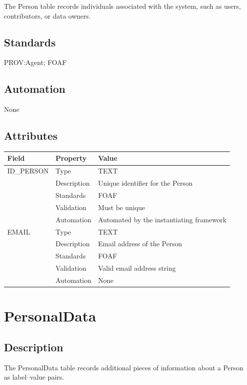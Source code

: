 The Person table records individuals associated with the system, such as
users, contributors, or data owners.

\subsection{Standards}\label{standards-22}

PROV:Agent; FOAF

\subsection{Automation}\label{automation-22}

None

\subsection{Attributes}\label{attributes-19}

\begin{longtable}[]{@{}lll@{}}
\toprule\noalign{}
Field & Property & Value \\
\midrule\noalign{}
\endhead
\bottomrule\noalign{}
\endlastfoot
ID\_PERSON & Type & TEXT \\
& Description & Unique identifier for the Person \\
& Standards & FOAF \\
& Validation & Must be unique \\
& Automation & Automated by the instantiating framework \\
EMAIL & Type & TEXT \\
& Description & Email address of the Person \\
& Standards & FOAF \\
& Validation & Valid email address string \\
& Automation & None \\
\end{longtable}

\section{PersonalData}\label{personaldata}

\subsection{Description}\label{description-21}

The PersonalData table records additional pieces of information about a
Person as label--value pairs.

